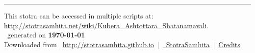 \documentclass[oneside,12pt]{book}
\begin{document}
\setmainfont[Script=Devanagari,Mapping=tex-text]{Sanskrit 2003}
\fontsize {16}{19.25}\selectfont
\begin{center}

\end{center}
\vfill
\centering
\rule{0.8\textwidth}{0.6pt}

\footnotesize
{}\sffamily
This stotra can be accessed in multiple scripts at:\\
\url{http://stotrasamhita.net/wiki/Kubera_Ashtottara_Shatanamavali}.\\[1ex]
\faFilePdfO~generated on \textbf{\today}\\[1ex]
Downloaded from \faGlobe{}~\url{http://stotrasamhita.github.io}~|~\href{https://github.com/StotraSamhita}{\faGithubSquare{}~StotraSamhita}~|~\href{https://stotrasamhita.github.io/about/}{Credits}
\end{document}
